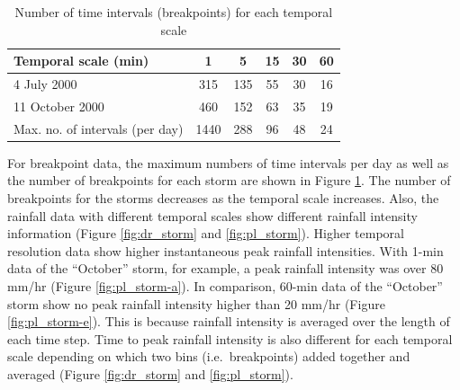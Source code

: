 \begin{table}[htbp]
  \centering
  \small
  \caption{Number of time intervals (breakpoints) for each temporal scale}
  \label{tab:maxnooftimeintervalsperday}
    \begin{tabular}{lccccc}
    \toprule
    Temporal scale (min) & 1 & 5 & 15 & 30 & 60 \\
    \midrule
    4 July 2000 & 315 & 135 & 55 & 30 & 16 \\
    11 October 2000 & 460 & 152 & 63 & 35 & 19 \\
    Max. no. of intervals (per day) & 1440 & 288 & 96 & 48 & 24 \\
    \bottomrule
    \end{tabular}
\end{table}

For breakpoint data, the maximum numbers of time intervals per day as well as
the number of breakpoints for each storm are shown in Figure
\ref{tab:maxnooftimeintervalsperday}. The number of breakpoints for the storms
decreases as the temporal scale increases. Also, the rainfall data with
different temporal scales show different rainfall intensity information (Figure
\ref{fig:dr_storm} and \ref{fig:pl_storm}). Higher temporal resolution data show
higher instantaneous peak rainfall intensities. With 1-min data of the
``October'' storm, for example, a peak rainfall intensity was over 80 mm/hr
(Figure \ref{fig:pl_storm-a}). In comparison, 60-min data of the ``October''
storm show no peak rainfall intensity higher than 20 mm/hr (Figure
\ref{fig:pl_storm-e}). This is because rainfall intensity is averaged over the
length of each time step. Time to peak rainfall intensity is also different for
each temporal scale depending on which two bins (i.e.\ breakpoints) added
together and averaged (Figure \ref{fig:dr_storm} and \ref{fig:pl_storm}).

